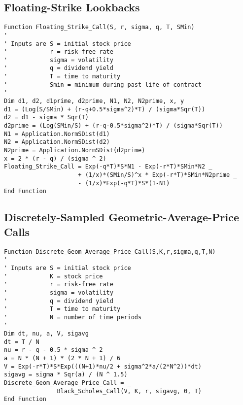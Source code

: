 \subsection*{Floating-Strike Lookbacks}

\small\begin{verbatim}
Function Floating_Strike_Call(S, r, sigma, q, T, SMin)
'
' Inputs are S = initial stock price
'            r = risk-free rate
'            sigma = volatility
'            q = dividend yield
'            T = time to maturity
'            Smin = minimum during past life of contract
'
Dim d1, d2, d1prime, d2prime, N1, N2, N2prime, x, y
d1 = (Log(S/SMin) + (r-q+0.5*sigma^2)*T) / (sigma*Sqr(T))
d2 = d1 - sigma * Sqr(T)
d2prime = (Log(SMin/S) + (r-q-0.5*sigma^2)*T) / (sigma*Sqr(T))
N1 = Application.NormSDist(d1)
N2 = Application.NormSDist(d2)
N2prime = Application.NormSDist(d2prime)
x = 2 * (r - q) / (sigma ^ 2)
Floating_Strike_Call = Exp(-q*T)*S*N1 - Exp(-r*T)*SMin*N2 _
                     + (1/x)*(SMin/S)^x * Exp(-r*T)*SMin*N2prime _
                     - (1/x)*Exp(-q*T)*S*(1-N1)
End Function
\end{verbatim}\normalsize


\subsection*{Discretely-Sampled Geometric-Average-Price Calls}

\small\begin{verbatim}
Function Discrete_Geom_Average_Price_Call(S,K,r,sigma,q,T,N)
'
' Inputs are S = initial stock price
'            K = stock price
'            r = risk-free rate
'            sigma = volatility
'            q = dividend yield
'            T = time to maturity
'            N = number of time periods
'
Dim dt, nu, a, V, sigavg
dt = T / N
nu = r - q - 0.5 * sigma ^ 2
a = N * (N + 1) * (2 * N + 1) / 6
V = Exp(-r*T)*S*Exp(((N+1)*nu/2 + sigma^2*a/(2*N^2))*dt)
sigavg = sigma * Sqr(a) / (N ^ 1.5)
Discrete_Geom_Average_Price_Call = _
               Black_Scholes_Call(V, K, r, sigavg, 0, T)
End Function
\end{verbatim}\normalsize

